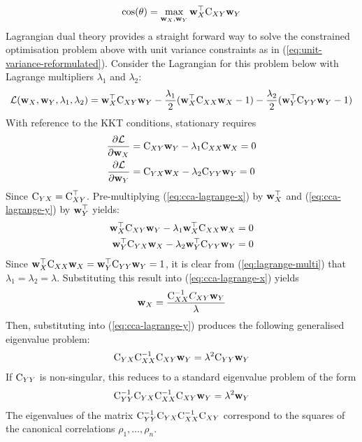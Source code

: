 \begin{equation}
\cos(\theta) = \max_{{\mathbf{w}}_X, {\mathbf{w}}_Y} {\mathbf{w}}_X^\top {\textrm{C}}_{XY} {\mathbf{w}}_Y 
\end{equation}
Lagrangian dual theory provides a straight forward way to solve the constrained optimisation problem above with unit variance constraints as in (\ref{eq:unit-variance-reformulated}). Consider the Lagrangian for this problem below with Lagrange multipliers $\lambda_1$ and $\lambda_2$:
\begin{equation}
    \mathcal{L}({\mathbf{w}}_X, {\mathbf{w}}_Y, \lambda_1, \lambda_2) = {\mathbf{w}}_X^\top {\textrm{C}}_{XY} {\mathbf{w}}_Y - \frac{\lambda_1}{2}({\mathbf{w}}_X^\top {\textrm{C}}_{XX} {\mathbf{w}}_X-1) - \frac{\lambda_2}{2}({\mathbf{w}}_Y^\top {\textrm{C}}_{YY} {\mathbf{w}}_Y-1)
\end{equation}
With reference to the KKT conditions, stationary requires
\begin{align}
    \label{eq:cca-lagrange-x}
    \frac{\partial \mathcal{L}}{\partial {\mathbf{w}}_X} &= {\textrm{C}}_{XY} {\mathbf{w}}_Y - \lambda_1{\textrm{C}}_{XX} {\mathbf{w}}_X = 0 \\
    \frac{\partial \mathcal{L}}{\partial {\mathbf{w}}_Y} &= {\textrm{C}}_{YX} {\mathbf{w}}_X - \lambda_2{\textrm{C}}_{YY} {\mathbf{w}}_Y = 0
        \label{eq:cca-lagrange-y}
\end{align}
Since ${\textrm{C}}_{YX} = {\textrm{C}}_{XY}^\top$. Pre-multiplying (\ref{eq:cca-lagrange-x}) by ${\mathbf{w}}_X^\top$ and (\ref{eq:cca-lagrange-y}) by ${\mathbf{w}}_Y^\top$ yields:
\begin{align}
\begin{split}
    {\mathbf{w}}_X^\top{\textrm{C}}_{XY} {\mathbf{w}}_Y - \lambda_1{\mathbf{w}}_X^\top{\textrm{C}}_{XX} {\mathbf{w}}_X &= 0 \\
    {\mathbf{w}}_Y^\top{\textrm{C}}_{YX} {\mathbf{w}}_X - \lambda_2{\mathbf{w}}_Y^\top{\textrm{C}}_{YY} {\mathbf{w}}_Y &= 0
\end{split}
\label{eq:lagrange-multi}
\end{align}
Since ${\mathbf{w}}_X^\top {\textrm{C}}_{XX} {\mathbf{w}}_X = {\mathbf{w}}_Y^\top {\textrm{C}}_{YY} {\mathbf{w}}_Y =1$, it is clear from (\ref{eq:lagrange-multi}) that $\lambda_1=\lambda_2 = \lambda$. Substituting this result into (\ref{eq:cca-lagrange-x}) yields
\begin{align}
    {\mathbf{w}}_X = \frac{{\textrm{C}}_{XX}^{-1}C_{XY}{\mathbf{w}}_Y}{\lambda}
\end{align}
Then, substituting into (\ref{eq:cca-lagrange-y}) produces the following generalised eigenvalue problem:
\begin{align}
    {\textrm{C}}_{YX}{\textrm{C}}^{-1}_{XX}{\textrm{C}}_{XY}{\mathbf{w}}_{Y} = \lambda^2{\textrm{C}}_{YY}{\mathbf{w}}_Y
\end{align}
If ${\textrm{C}}_{YY}$ is non-singular, this reduces to a standard eigenvalue problem of the form
\begin{align}
    {\textrm{C}}_{YY}^{-1}{\textrm{C}}_{YX}{\textrm{C}}^{-1}_{XX}{\textrm{C}}_{XY}{\mathbf{w}}_{Y} = \lambda^2{\mathbf{w}}_Y
\end{align}
The eigenvalues of the matrix ${\textrm{C}}_{YY}^{-1}{\textrm{C}}_{YX}{\textrm{C}}^{-1}_{XX}{\textrm{C}}_{XY}$ correspond to the squares of the canonical correlations $\rho_1, \dots, \rho_n$.


